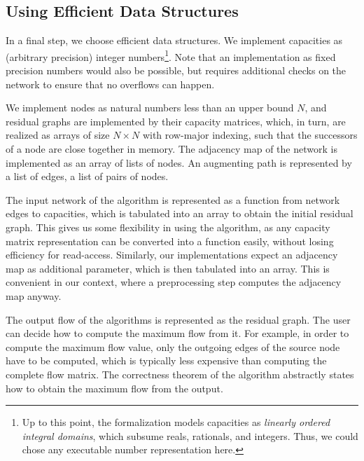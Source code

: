 \documentclass[smallcondensed]{svjour3}     %
\newcommand{\isai}{\lstinline[language=isabelle,basicstyle=\normalsize\ttfamily\slshape]}
\begin{document}
  \subsection{Using Efficient Data Structures}\label{sec:impl_data_structures}
  In a final step, we choose efficient data structures. 
  We implement capacities as (arbitrary precision) integer numbers\footnote{Up to this point, the formalization models capacities as \emph{linearly ordered integral domains}, which subsume reals, rationals, and integers. Thus, we could chose any executable number representation here.}. Note that an implementation as fixed precision numbers would also be possible,
  but requires additional checks on the network to ensure that no overflows can happen. 
  
  We implement nodes as natural numbers less than an upper bound $N$, and residual graphs are implemented by their capacity matrices, which, in turn,
  are realized as arrays of size $N\times N$ with row-major indexing, such that the successors of a node are close together in memory.
  The adjacency map of the network is implemented as an array of lists of nodes. 
  An augmenting path is represented by a list of edges, \ie a list of pairs of nodes. 
  
  
  
  
  The input network of the algorithm is represented as a function from network edges to capacities, which is tabulated into an array
  to obtain the initial residual graph. This gives us some flexibility in using the algorithm, as any capacity matrix representation can be converted into a 
  function easily, without losing efficiency for read-access. 
  Similarly, our implementations expect an adjacency map as additional parameter, which is then tabulated into an array. This is convenient in our context, 
  where a preprocessing step computes the adjacency map anyway.
      
  The output flow of the algorithms is represented as the residual graph. The user can decide how to compute the maximum flow from it. For example,
  in order to compute the maximum flow value, only the outgoing edges of the source node have to be computed, which is typically less 
  expensive than computing the complete flow matrix. The correctness theorem of the algorithm abstractly states how to obtain the maximum flow from the output.
  
\end{document}
